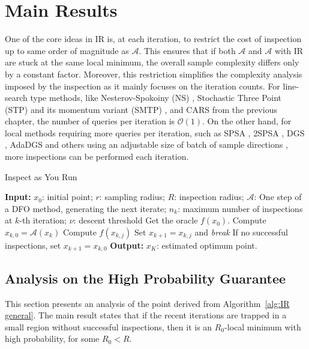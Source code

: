 
\section{Main Results}
One of the core ideas in IR is, at each iteration, to restrict the cost of inspection up to same order of magnitude as $\mathcal{A}$.
This ensures that if both $\mathcal{A}$ and $\mathcal{A}$ with IR are stuck at the same local minimum, the overall sample complexity differs only by a constant factor.
Moreover, this restriction simplifies the complexity analysis imposed by the inspection as it mainly focuses on the iteration counts.
For line-search type methods, like Nesterov-Spokoiny (NS) \cite{nesterov2017random}, Stochastic Three Point (STP) and its momentum variant (SMTP) \cite{bergou2020stochastic,gorbunov2019stochastic}, and CARS from the previous chapter, the number of queries per iteration is $\mathcal{O}(1)$.
On the other hand, for local methods requiring more queries per iteration, such as SPSA \cite{spall1992multivariate}, 2SPSA \cite{spall2000adaptive}, DGS \cite{zhang2020novel}, AdaDGS \cite{tran2020adadgs} and others using an adjustable size of batch of sample directions \cite{mania2018simple,salimans2017evolution},  more inspections can be performed each iteration.


\begin{algorithm}[H]
    \caption{Inspect as You Run}
     \label{alg:IR general}
    \begin{algorithmic}[1]
      \State \textbf{Input:} $x_0$: initial point; $r$: sampling radius; $R$: inspection radius; $\mathcal{A}$: One step of a DFO method, generating the next iterate; $n_k$: maximum number of inspections at $k$-th iteration; $\nu$: descent threshold
      \State Get the oracle $f(x_0)$.
            \State Compute $x_{k, 0} = \mathcal{A}(x_k)$
                \State Compute $f(x_{k,j})$ 
                    \State Set $x_{k+1} = x_{k,j}$ and \emph{break}
                \EndIf
            \EndFor
            \State If no successful inspections, set $x_{k+1} = x_{k,0}$ \label{eq: inspection step in the algorithm 1}
      \EndFor
       \State \textbf{Output:} $x_K$: estimated optimum point.
    \end{algorithmic}
\end{algorithm}

\subsection{Analysis on the High Probability Guarantee}
This section presents an analysis of the point derived from Algorithm~\ref{alg:IR general}.
The main result states that if the recent iterations are trapped in a small region without successful inspections, then it is an $R_0$-local minimum with high probability, for some $R_0 < R$.

